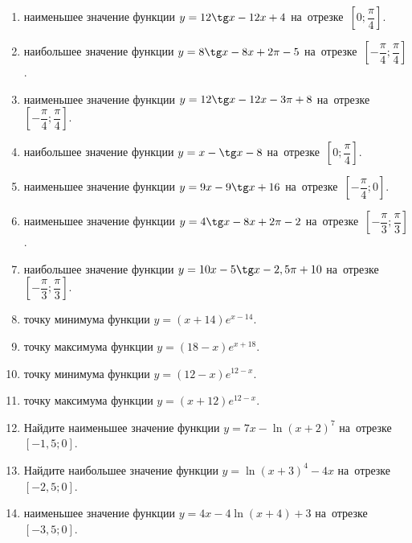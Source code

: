 \documentclass[a4paper,10pt]{article}
\begin{document}
\begin{enumerate}
\item {} наименьшее значение функции $y=12\tg x-12x+4$ на~отрезке~$\left[0;\dfrac{\pi }{4}\right]$.

\item {} наибольшее значение функции $y=8\tg x-8x+2\pi -5$ на~отрезке~$\left[-\dfrac{\pi }{4};\dfrac{\pi }{4}\right]$.

\item {} наименьшее значение функции $y=12\tg x-12x-3\pi +8$ на~отрезке~$\left[-\dfrac{\pi }{4};\dfrac{\pi }{4}\right]$.

\item {} наибольшее значение функции $y=x-\tg x-8$ на~отрезке~$\left[0;\dfrac{\pi }{4}\right]$.

\item {} наименьшее значение функции $y=9x-9\tg x+16$ на~отрезке~$\left[-\dfrac{\pi }{4};0\right]$.

\item {} наименьшее значение функции $y=4\tg x-8x+2\pi -2$ на~отрезке~$\left[-\dfrac{\pi }{3};\dfrac{\pi }{3}\right]$.

\item {} наибольшее значение функции $y=10x-5\tg x-2,5\pi +10$ на~отрезке~$\left[-\dfrac{\pi }{3};\dfrac{\pi }{3}\right]$.

\item {} точку минимума функции $y=\left(x+14\right)e^{x-14}$.

\item {} точку максимума функции $y=\left(18-x\right)e^{x+18}$.

\item {} точку минимума функции $y=\left(12-x\right)e^{12-x}$.

\item {} точку максимума функции $y=\left(x+12\right)e^{12-x}$.

\item Найдите наименьшее значение функции $y=7x-\ln \left(x+2\right)^7$ на~отрезке~$\left[-1,5;0\right]$.

\item Найдите наибольшее значение функции $y=\ln \left(x+3\right)^4-4x$ на~отрезке~$\left[-2,5;0\right]$.

\item {} наименьшее значение функции $y=4x-4\ln \left(x+4\right)+3$ на~отрезке~$\left[-3,5;0\right]$.


\end{enumerate}
\end{document}
